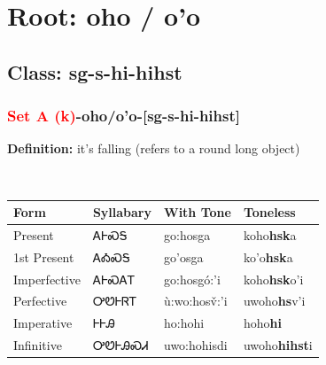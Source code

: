 \needspace{4in}
\section*{Root: oho / o'o}
\nopagebreak
{}
\needspace{3in}
\subsection*{Class: sg-s-hi-hihst}
\nopagebreak
\needspace{2in}
\subsubsection*{\textcolor{Red}{Set A (k)}{-}\textbf{oho/o'o}{-}[sg-s-hi-hihst]}
\nopagebreak
\textbf{Definition: } it{\textquoteright}s falling (refers to a round{\quotesinglbase} long object)
\\[0.5em]
\begin{tabularx}{\textwidth}{l X X X}%
\toprule%
\textbf{Form}&\textbf{Syllabary}&\textbf{With Tone}&\textbf{Toneless}\\%
\midrule%
Present&ᎪᎰᏍᎦ&go:hosga&koho\textbf{hsk}a\\%
1st Present&ᎪᎣᏍᎦ&go’osga&ko'o\textbf{hsk}a\\%
Imperfective&ᎪᎰᏍᎪᎢ&go:hosgó:’i&koho\textbf{hsk}o'i\\%
Perfective&ᎤᏬᎰᏒᎢ&ù:wo:hosv̌:’i&uwoho\textbf{hs}v'i\\%
Imperative&ᎰᎰᎯ&ho:hohi&hoho\textbf{hi}\\%
Infinitive&ᎤᏬᎰᎯᏍᏗ&uwo:hohisdi&uwoho\textbf{hihst}i\\%
\bottomrule%
\end{tabularx}
\\[1em]